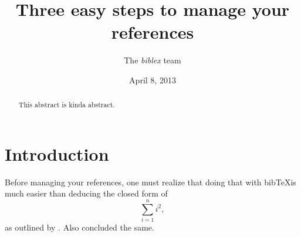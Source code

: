 \documentclass[11pt]{article}
\title{Three easy steps to manage your references}
\date{April 8, 2013}
\author{The \textit{biblex} team}
\begin{document}
\maketitle

\begin{abstract}
This abstract is kinda abstract.
\end{abstract}

\section{Introduction} Before managing your references, one must realize that doing that with bib\TeX is much easier than deducing the closed form of
\[\sum_{i = 1}^n i^2,\]
as outlined by \cite{biblex13}. Also \cite{millennium01} concluded the same.


{}
\end{document}
